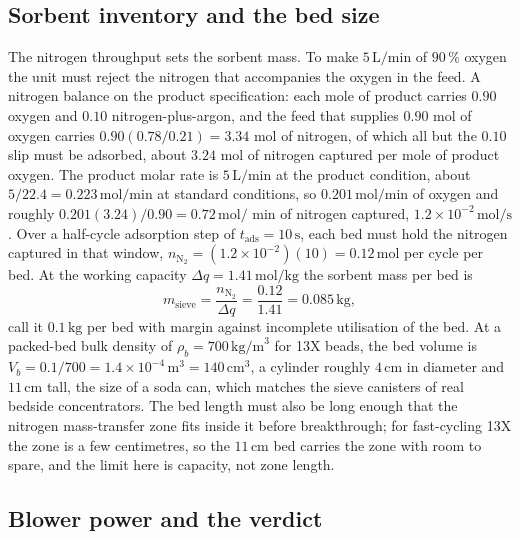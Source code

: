

\subsection{Sorbent inventory and the bed size}

The nitrogen throughput sets the sorbent mass. To make $5\,\text{L/min}$ of
$90\,\%$ oxygen the unit must reject the nitrogen that accompanies the
oxygen in the feed. A nitrogen balance on the product specification: each
mole of product carries $0.90$ oxygen and $0.10$ nitrogen-plus-argon, and
the feed that supplies $0.90$ mol of oxygen carries $0.90(0.78/0.21) =
3.34$ mol of nitrogen, of which all but the $0.10$ slip must be adsorbed,
about $3.24$ mol of nitrogen captured per mole of product oxygen. The
product molar rate is $5\,\text{L/min}$ at the product condition, about
$5/22.4 = 0.223\,\text{mol/min}$ at standard conditions, so $0.201\,
\text{mol/min}$ of oxygen and roughly $0.201(3.24)/0.90 = 0.72\,\text{mol/
min}$ of nitrogen captured, $1.2\times 10^{-2}\,\text{mol/s}$. Over a
half-cycle adsorption step of $t_{\text{ads}} = 10\,\text{s}$, each bed
must hold the nitrogen captured in that window, $n_{\text{N}_2} =
(1.2\times 10^{-2})(10) = 0.12\,\text{mol}$ per cycle per bed. At the
working capacity $\Delta q = 1.41\,\text{mol/kg}$ the sorbent mass per bed
is
\[
m_{\text{sieve}} = \frac{n_{\text{N}_2}}{\Delta q} = \frac{0.12}{1.41} =
0.085\,\text{kg},
\]
call it $0.1\,\text{kg}$ per bed with margin against incomplete utilisation
of the bed. At a packed-bed bulk density of $\rho_b = 700\,\text{kg/m}^3$
for 13X beads, the bed volume is $V_b = 0.1/700 = 1.4\times 10^{-4}\,
\text{m}^3 = 140\,\text{cm}^3$, a cylinder roughly $4\,\text{cm}$ in
diameter and $11\,\text{cm}$ tall, the size of a soda can, which matches the
sieve canisters of real bedside concentrators. The bed length must also be
long enough that the nitrogen mass-transfer zone fits inside it before
breakthrough; for fast-cycling 13X the zone is a few centimetres, so the
$11\,\text{cm}$ bed carries the zone with room to spare, and the limit here
is capacity, not zone length.

\subsection{Blower power and the verdict}

